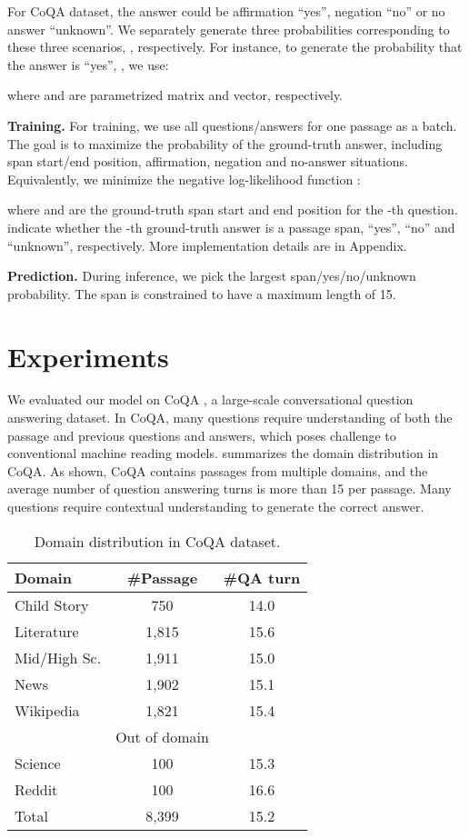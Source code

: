 \documentclass{article} \usepackage{sdnet,times}
\begin{document}
For CoQA dataset, the answer could be affirmation ``yes'', negation ``no'' or no answer ``unknown''. We separately generate three probabilities corresponding to these three scenarios, , respectively. For instance, to generate the probability that the answer is ``yes'', , we use:


where  and  are parametrized matrix and vector, respectively.

\textbf{Training.} For training, we use all questions/answers for one passage as a batch. The goal is to maximize the probability of the ground-truth answer, including span start/end position, affirmation, negation and no-answer situations. Equivalently, we minimize the negative log-likelihood function :

where  and  are the ground-truth span start and end position for the -th question.  indicate whether the -th ground-truth answer is a passage span, ``yes'', ``no'' and ``unknown'', respectively. More implementation details are in Appendix.

\textbf{Prediction.} During inference, we pick the largest span/yes/no/unknown probability. The span is constrained to have a maximum length of 15.

\section{Experiments}
\label{exp}
We evaluated our model on CoQA \citep{coqa}, a large-scale conversational question answering dataset. In CoQA, many questions require understanding of both the passage and previous questions and answers, which poses challenge to conventional machine reading models.  summarizes the domain distribution in CoQA. As shown, CoQA contains passages from multiple domains, and the average number of question answering turns is more than 15 per passage. Many questions require contextual understanding to generate the correct answer.

\begin{table}[t]
\centering
\caption{Domain distribution in CoQA dataset.}\label{table:coqa}
\vspace{-0.5\baselineskip}
\begin{tabular}{lcc}
\toprule
Domain & \#Passage & \#QA turn\\ \midrule
Child Story & 750 & 14.0\\
Literature & 1,815 & 15.6\\
Mid/High Sc. & 1,911 & 15.0\\
News & 1,902 & 15.1\\
Wikipedia & 1,821 &  15.4 \\ \midrule 
& Out of domain & \\ \midrule 
Science & 100 &  15.3\\
Reddit & 100 & 16.6\\ \midrule
Total & 8,399 & 15.2\\
\bottomrule

\end{tabular}
\end{table}
\end{document}
